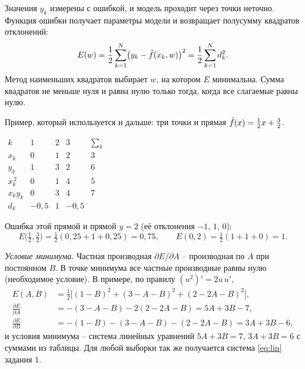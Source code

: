 \documentclass[12pt,a4paper]{article}
\begin{document}
Значения $y_k$ измерены с ошибкой, и модель проходит через точки неточно.
Функция ошибки получает параметры модели и возвращает полусумму квадратов
отклонений:
\[
  E(w) = \frac12\sum_{k=1}^{N}\bigl(y_k - \tilde{f}(x_k, w)\bigr)^2
       = \frac12\sum_{k=1}^{N} d_k^2 .
\]
Метод наименьших квадратов выбирает $w$, на котором $E$ минимальна. Сумма
квадратов не меньше нуля и равна нулю только тогда, когда все слагаемые равны
нулю.

Пример, который используется и дальше: три точки и прямая
$\tilde{f}(x) = \frac12x + \frac32$.
\begin{center}
\begin{minipage}{0.44\textwidth}
\centering
$\begin{array}{c|ccc|c}
  k & 1 & 2 & 3 & \sum_k\\ \hline
  x_k & 0 & 1 & 2 & 3\\
  y_k & 1 & 3 & 2 & 6\\
  x_k^{\,2} & 0 & 1 & 4 & 5\\
  x_ky_k & 0 & 3 & 4 & 7\\ \hline
  d_k & -0{,}5 & 1 & -0{,}5 &
\end{array}$
\end{minipage}\hfill
\begin{minipage}{0.52\textwidth}
\centering
{}
\end{minipage}
\end{center}
Ошибка этой прямой и прямой $y = 2$ (её отклонения $-1$, $1$, $0$):
\[
  E\bigl(\tfrac12, \tfrac32\bigr) = \tfrac12(0{,}25 + 1 + 0{,}25) = 0{,}75,
  \qquad
  E(0, 2) = \tfrac12(1 + 1 + 0) = 1 .
\]

\emph{Условие минимума.} Частная производная $\partial E/\partial A$ --
производная по $A$ при постоянном $B$. В точке минимума все частные
производные равны нулю (необходимое условие). В примере, по правилу
$(u^2)' = 2u\,u'$,
\begin{align*}
  E(A, B) &= \tfrac12\bigl[(1 - B)^2 + (3 - A - B)^2 + (2 - 2A - B)^2\bigr],
  \\[1mm]
  \frac{\partial E}{\partial A} &= -(3 - A - B) - 2(2 - 2A - B) = 5A + 3B - 7,
  \\[1mm]
  \frac{\partial E}{\partial B} &= -(1 - B) - (3 - A - B) - (2 - 2A - B)
                                 = 3A + 3B - 6,
\end{align*}
и условия минимума -- система линейных уравнений $5A + 3B = 7$, $3A + 3B = 6$
с суммами из таблицы. Для любой выборки так же получается система
\eqref{eq:lin} задания 1.
\end{document}

